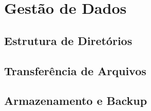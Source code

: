 \chapter{Gestão de Dados}
\label{chap:gestao-de-dados}

\section{Estrutura de Diretórios}
\label{sec:estrutura-de-diretorios}

\lipsum[1-2]

\section{Transferência de Arquivos}
\label{sec:transferencia-de-arquivos}

\lipsum[1-2]

\section{Armazenamento e Backup}
\label{sec:armazenamento-e-backup}

\lipsum[1-2]
